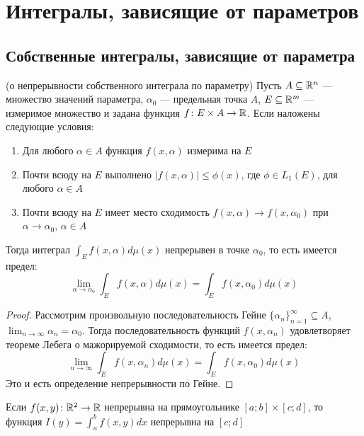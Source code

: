 \section{Интегралы, зависящие от параметров}

\subsection{Собственные интегралы, зависящие от параметра}

\begin{theorem} (о непрерывности собственного интеграла по параметру)
	Пусть $A \subseteq \mathbb{R}^n$ --- множество значений параметра, $\alpha_0$ --- предельная точка $A$, $E \subseteq \mathbb{R}^m$ --- измеримое множество и задана функция $f \colon E \times A \to \mathbb{R}$. Если наложены следующие условия:
	\begin{enumerate}
		\item Для любого $\alpha \in A$ функция $f(x, \alpha)$ измерима на $E$
		
		\item Почти всюду на $E$ выполнено $|f(x, \alpha)| \le \phi(x)$, где $\phi \in L_1(E)$, для любого $\alpha \in A$
		
		\item Почти всюду на $E$ имеет место сходимость $f(x, \alpha) \to f(x, \alpha_0)$ при $\alpha \to \alpha_0$, $\alpha \in A$
	\end{enumerate}
	Тогда интеграл $\int_E f(x, \alpha)d\mu(x)$ непрерывен в точке $\alpha_0$, то есть имеется предел:
	\[
		\lim_{\alpha \to \alpha_0} \int_E f(x, \alpha)d\mu(x) = \int_E f(x, \alpha_0)d\mu(x)
	\]
\end{theorem}

\begin{proof}
	Рассмотрим произвольную последовательность Гейне $\{\alpha_n\}_{n = 1}^\infty \subseteq A$, \\ $\lim_{n \to \infty} \alpha_n = \alpha_0$. Тогда последовательность функций $f(x, \alpha_n)$ удовлетворяет теореме Лебега о мажорируемой сходимости, то есть имеется предел:
	\[
		\lim_{n \to \infty} \int_E f(x, \alpha_n)d\mu(x) = \int_E f(x, \alpha_0)d\mu(x)
	\]
	Это и есть определение непрерывности по Гейне.
\end{proof}

\begin{corollary}
	Если $f(x, y) \colon \mathbb{R}^2 \to \mathbb{R}$ непрерывна на прямоугольнике $[a; b] \times [c; d]$, то функция $I(y) = \int_a^b f(x, y)dx$ непрерывна на $[c; d]$
\end{corollary}

